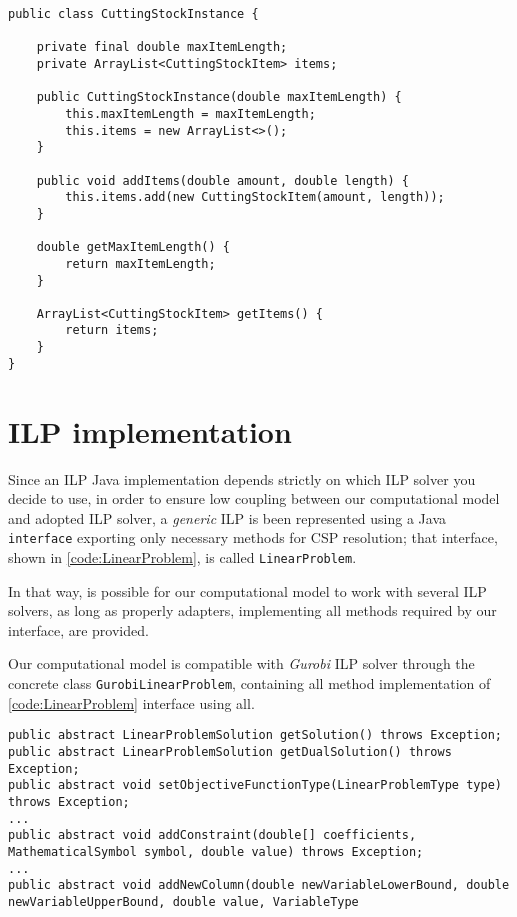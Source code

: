 \documentclass[10pt,a4paper]{article}
\begin{document}
\begin{lstlisting}[frame=lines, caption={\texttt{CuttingStockInstance} class implementation.}, label={code:instance}]
public class CuttingStockInstance {

    private final double maxItemLength;
    private ArrayList<CuttingStockItem> items;

    public CuttingStockInstance(double maxItemLength) {
        this.maxItemLength = maxItemLength;
        this.items = new ArrayList<>();
    }

    public void addItems(double amount, double length) {
        this.items.add(new CuttingStockItem(amount, length));
    }

    double getMaxItemLength() {
        return maxItemLength;
    }

    ArrayList<CuttingStockItem> getItems() {
        return items;
    }
}
\end{lstlisting}

\section{ILP implementation}

Since an ILP Java implementation depends strictly on which ILP solver you decide to use, in order to ensure low coupling between our computational model and adopted ILP solver, a \textit{generic} ILP is been represented using a Java \texttt{interface} exporting only necessary methods for CSP resolution; that interface, shown in \ref{code:LinearProblem}, is called \texttt{LinearProblem}.

In that way, is possible for our computational model to work with several ILP solvers, as long as properly adapters, implementing all methods required by our interface, are provided. 

Our computational model is compatible with \textit{Gurobi} ILP solver through the concrete class \texttt{GurobiLinearProblem}, containing all method implementation of \ref{code:LinearProblem} interface using all.

\begin{lstlisting}[frame=lines, caption={Some methods exported by \texttt{LinearProblem} interface.}, label={code:LinearProblem}]
public abstract LinearProblemSolution getSolution() throws Exception; 
public abstract LinearProblemSolution getDualSolution() throws Exception;
public abstract void setObjectiveFunctionType(LinearProblemType type) throws Exception;
...
public abstract void addConstraint(double[] coefficients, MathematicalSymbol symbol, double value) throws Exception;
...
public abstract void addNewColumn(double newVariableLowerBound, double newVariableUpperBound, double value, VariableType
\end{lstlisting}
\end{document}
